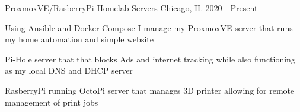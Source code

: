 

\begin{cventries}

	\cventry
	{ProxmoxVE/RasberryPi} %
	{Homelab Servers} %
	{Chicago, IL} %
	{2020 - Present} %
	{
		\begin{cvitems} %
			\item {Using Ansible and Docker-Compose I manage my ProxmoxVE server that runs my home automation and simple website}
			\item {Pi-Hole server that that blocks Ads and internet tracking while also functioning as my local DNS and DHCP server}
			\item {RasberryPi running OctoPi server that manages 3D printer allowing for remote management of print jobs}
		\end{cvitems}
	}

\end{cventries}
